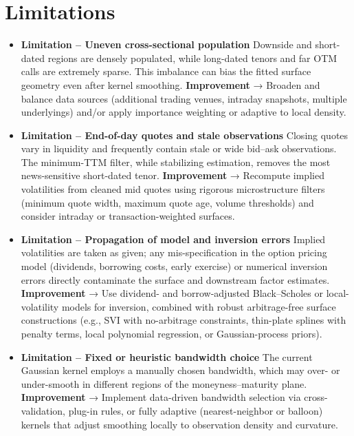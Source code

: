 \documentclass[a4paper,12pt]{report}
\begin{document}
\section{Limitations}
\begin{itemize}
    \item \textbf{Limitation – Uneven cross-sectional population}  
      Downside and short-dated regions are densely populated, while long-dated tenors and far OTM calls are extremely sparse. This imbalance can bias the fitted surface geometry even after kernel smoothing.  
      \textbf{Improvement} → Broaden and balance data sources (additional trading venues, intraday snapshots, multiple underlyings) and/or apply importance weighting or adaptive to local density.

    \item \textbf{Limitation – End-of-day quotes and stale observations}  
      Closing quotes vary in liquidity and frequently contain stale or wide bid–ask observations. The minimum-TTM filter, while stabilizing estimation, removes the most news-sensitive short-dated tenor.  
      \textbf{Improvement} → Recompute implied volatilities from cleaned mid quotes using rigorous microstructure filters (minimum quote width, maximum quote age, volume thresholds) and consider intraday or transaction-weighted surfaces.

    \item \textbf{Limitation – Propagation of model and inversion errors}  
      Implied volatilities are taken as given; any mis-specification in the option pricing model (dividends, borrowing costs, early exercise) or numerical inversion errors directly contaminate the surface and downstream factor estimates.  
      \textbf{Improvement} → Use dividend- and borrow-adjusted Black--Scholes or local-volatility models for inversion, combined with robust arbitrage-free surface constructions (e.g., SVI with no-arbitrage constraints, thin-plate splines with penalty terms, local polynomial regression, or Gaussian-process priors).

    \item \textbf{Limitation – Fixed or heuristic bandwidth choice}  
      The current Gaussian kernel employs a manually chosen bandwidth, which may over- or under-smooth in different regions of the moneyness--maturity plane.  
      \textbf{Improvement} → Implement data-driven bandwidth selection via cross-validation, plug-in rules, or fully adaptive (nearest-neighbor or balloon) kernels that adjust smoothing locally to observation density and curvature.
\end{itemize}
\end{document}
